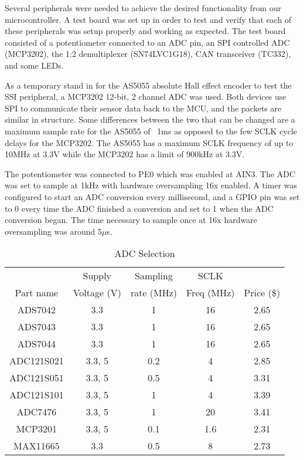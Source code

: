 \noindent Several peripherals were needed to achieve the desired functionality from our microcontroller. A test board was set up in order to test and verify that each of these peripherals was setup properly and working as expected. The test board consisted of a potentiometer connected to an ADC pin, an SPI controlled ADC (MCP3202), the 1:2 demultiplexer (SN74LVC1G18), CAN transceiver (TC332), and some LEDs.

\noindent As a temporary stand in for the AS5055 absolute Hall effect encoder to test the SSI peripheral, a MCP3202 12-bit, 2 channel ADC was used. Both devices use SPI to communicate their sensor data back to the MCU, and the packets are similar in structure. Some differences between the two that can be changed are a maximum sample rate for the AS5055 of ~1ms as opposed to the few SCLK cycle delays for the MCP3202. The AS5055 has a maximum SCLK frequency of up to 10MHz at 3.3V while the MCP3202 has a limit of 900kHz at 3.3V. 

\noindent The potentiometer was connected to PE0 which was enabled at AIN3. The ADC was set to sample at 1kHz with hardware oversampling 16x enabled. A timer was configured to start an ADC conversion every millisecond, and a GPIO pin was set to 0 every time the ADC finished a conversion and set to 1 when the ADC conversion began. The time necessary to sample once at 16x hardware oversampling was around 5$\mu$s.


\begin{table}[H]
	\centering
	\caption{ADC Selection}

\begin{tabular}{|c|c|c|c|c|}
\hline
& Supply & Sampling & SCLK & \\
Part name & Voltage (V) & rate (MHz) & Freq (MHz) & Price (\$) \\
\hline
ADS7042 & 3.3 & 1 & 16 & 2.65 \\

ADS7043 & 3.3 & 1 & 16 & 2.65 \\

ADS7044 & 3.3 & 1 & 16 & 2.65 \\

ADC121S021 & 3.3, 5 & 0.2 & 4 & 2.85 \\

ADC121S051 & 3.3, 5 & 0.5 & 4 & 3.31 \\

ADC121S101 & 3.3, 5 & 1 & 4 & 3.39 \\

ADC7476 & 3.3, 5 & 1 & 20 & 3.41 \\

MCP3201 & 3.3, 5 & 0.1 & 1.6 & 2.31 \\

MAX11665 & 3.3 & 0.5 & 8 & 2.73 \\
\hline
\end{tabular}

\label{tbl:ADC Selection}
\end{table}

